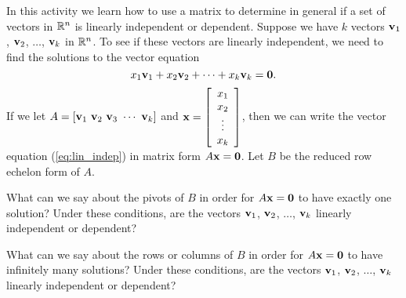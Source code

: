 \begin{activity} \label{act:1_f_3} In this activity we learn how to use a matrix to determine in general if a set of vectors in $\mathbb{R}^n$ is linearly independent or dependent. Suppose we have $k$ vectors $\mathbf{v}_1$, $\mathbf{v}_2$, $\ldots$, $\mathbf{v}_k$ in $\mathbb{R}^n$. To see if these vectors are linearly independent, we need to find the solutions to the vector equation
\begin{equation} \label{eq:lin_indep}
x_1 \mathbf{v}_1 + x_2 \mathbf{v}_2 + \cdots + x_k \mathbf{v}_k = \mathbf{0}.
\end{equation}
If we let $A = [\vv_1 \  \vv_2 \ \vv_3 \ \cdots \ \vv_k]$ and $\mathbf{x} = \left[ \begin{array}{c} x_1 \\ x_2 \\ \vdots \\ x_k \end{array} \right]$, then we can write the vector equation (\ref{eq:lin_indep}) in matrix form $A \mathbf{x} = \mathbf{0}$. Let $B$ be the reduced row echelon form of $A$.
	\ba
	\item  What can we say about the pivots of $B$ in order for $A \mathbf{x} = \mathbf{0}$ to have exactly one solution? Under these conditions, are the vectors $\mathbf{v}_1$, $\mathbf{v}_2$, $\ldots$, $\mathbf{v}_k$ linearly independent or dependent? 

	
	
	\item What can we say about the rows or columns of $B$ in order for $A \mathbf{x} = \mathbf{0}$ to have infinitely many solutions? Under these conditions, are the vectors $\mathbf{v}_1$, $\mathbf{v}_2$, $\ldots$, $\mathbf{v}_k$ linearly independent or dependent? 
	
	
	

\end{activity}
